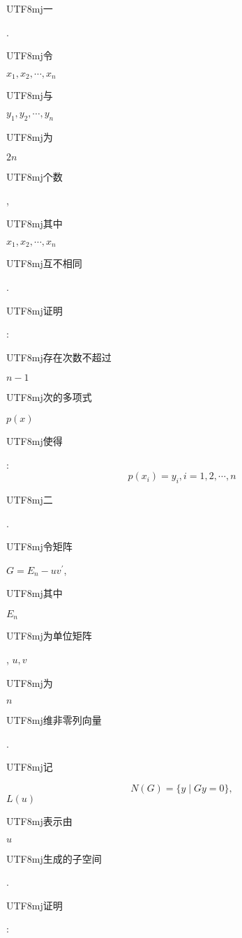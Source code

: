 \documentclass[10pt]{article}
\begin{document}
\begin{CJK}{UTF8}{mj}一\end{CJK}. \begin{CJK}{UTF8}{mj}令\end{CJK} $x_{1}, x_{2}, \cdots, x_{n}$ \begin{CJK}{UTF8}{mj}与\end{CJK} $y_{1}, y_{2}, \cdots, y_{n}$ \begin{CJK}{UTF8}{mj}为\end{CJK} $2 n$ \begin{CJK}{UTF8}{mj}个数\end{CJK}, \begin{CJK}{UTF8}{mj}其中\end{CJK} $x_{1}, x_{2}, \cdots, x_{n}$ \begin{CJK}{UTF8}{mj}互不相同\end{CJK}. \begin{CJK}{UTF8}{mj}证明\end{CJK}: \begin{CJK}{UTF8}{mj}存在次数不超过\end{CJK} $n-1$ \begin{CJK}{UTF8}{mj}次的多项式\end{CJK} $p(x)$ \begin{CJK}{UTF8}{mj}使得\end{CJK}:
$$
p\left(x_{i}\right)=y_{i}, i=1,2, \cdots, n
$$
\begin{CJK}{UTF8}{mj}二\end{CJK}. \begin{CJK}{UTF8}{mj}令矩阵\end{CJK} $G=E_{n}-u v^{\prime}$, \begin{CJK}{UTF8}{mj}其中\end{CJK} $E_{n}$ \begin{CJK}{UTF8}{mj}为单位矩阵\end{CJK}, $u, v$ \begin{CJK}{UTF8}{mj}为\end{CJK} $n$ \begin{CJK}{UTF8}{mj}维非零列向量\end{CJK}. \begin{CJK}{UTF8}{mj}记\end{CJK}
$$
N(G)=\{y \mid G y=0\},
$$
$L(u)$ \begin{CJK}{UTF8}{mj}表示由\end{CJK} $u$ \begin{CJK}{UTF8}{mj}生成的子空间\end{CJK}. \begin{CJK}{UTF8}{mj}证明\end{CJK}:
\end{document}
